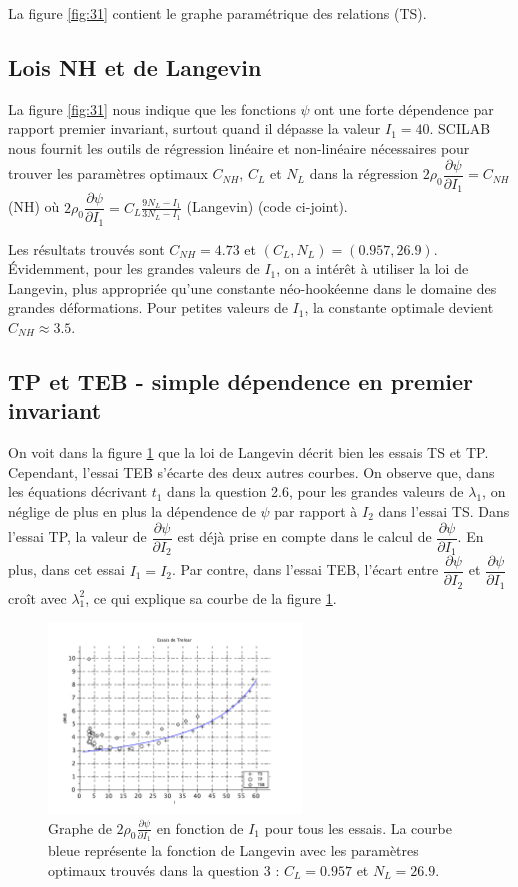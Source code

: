 \documentclass[a4paper,11pt]{article}
\begin{document}
La figure \ref{fig:31} contient le graphe paramétrique des relations (TS).

\subsection{Lois NH et de Langevin}
La figure \ref{fig:31} nous indique que les fonctions $\psi$ ont une forte dépendence par rapport premier invariant, surtout quand il dépasse la valeur $I_1 = 40$. SCILAB nous fournit les outils de régression linéaire et non-linéaire nécessaires pour trouver les paramètres optimaux $C_{NH}$, $C_L$ et $N_L$ dans la régression $2 \rho_0 \dfrac{\partial\psi}{\partial I_1} = C_{NH}$ (NH) où $2 \rho_0 \dfrac{\partial\psi}{\partial I_1} = C_L \frac{9N_L-I_1}{3N_L-I_1}$ (Langevin) (code ci-joint).

Les résultats trouvés sont $C_{NH} = 4.73$ et $(C_L, N_L) = (0.957, 26.9)$. Évidemment, pour les grandes valeurs de $I_1$, on a intérêt à utiliser la loi de Langevin, plus appropriée qu'une constante néo-hookéenne dans le domaine des grandes déformations. Pour petites valeurs de $I_1$, la constante optimale devient $C_{NH} \approx 3.5$.

\subsection{TP et TEB - simple dépendence en premier invariant}

On voit dans la figure \ref{fig:32} que la loi de Langevin décrit bien les essais TS et TP. Cependant, l'essai TEB s'écarte des deux autres courbes. On observe que, dans les équations décrivant $t_1$ dans la question 2.6, pour les grandes valeurs de $\lambda_1$, on néglige de plus en plus la dépendence de $\psi$ par rapport à $I_2$ dans l'essai TS. Dans l'essai TP, la valeur de $\dfrac{\partial\psi}{\partial I_2}$ est déjà prise en compte dans le calcul de $\dfrac{\partial\psi}{\partial I_1}$. En plus, dans cet essai $I_1 = I_2$. Par contre, dans l'essai TEB, l'écart entre $\dfrac{\partial\psi}{\partial I_2}$ et $\dfrac{\partial\psi}{\partial I_1}$ croît avec $\lambda_1^2$, ce qui explique sa courbe de la figure \ref{fig:32}.

\begin{figure}[!ht]
\centering
\includegraphics[width=0.6\textwidth]{scilab_prof/q32.pdf}
\caption{Graphe de $2 \rho_0 \frac{\partial\psi}{\partial I_1}$ en fonction de $I_1$ pour tous les essais. La courbe bleue représente la fonction de Langevin avec les paramètres optimaux trouvés dans la question 3 : $C_L = 0.957$ et $N_L=26.9$.}
\label{fig:32}
\end{figure}
\end{document}
